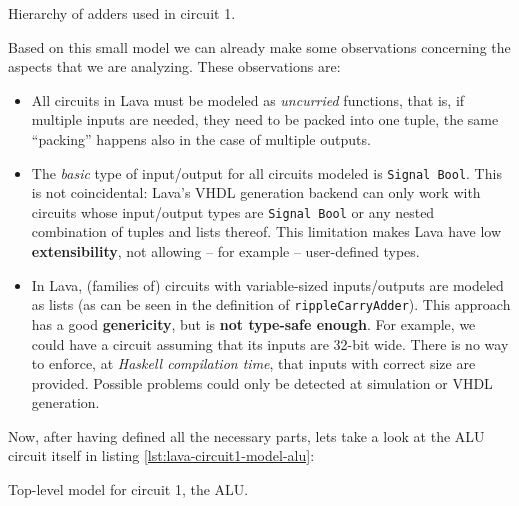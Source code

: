             \begin{listing}[h!]
                \caption{Hierarchy of adders used in circuit 1.
                    \label{lst:lava-circuit1-model-adders}}
            \end{listing}

            Based on this small model we can already make some observations concerning the aspects
            that we are analyzing. These observations are:

            \begin{itemize}
                \item All circuits in Lava must be modeled as \emph{uncurried} functions, that is,
                    if multiple inputs are needed, they need to be packed into one tuple, the same
                    ``packing'' happens also in the case of multiple outputs.

                \item The \emph{basic} type of input/output for all circuits modeled is
                    \texttt{Signal Bool}. This is not coincidental: Lava's VHDL generation backend
                    can only work with circuits whose input/output types are \texttt{Signal Bool} or
                    any nested combination of tuples and lists thereof.  This limitation makes Lava
                    have low \textbf{extensibility}, not allowing -- for example -- user-defined
                    types.

                \item In Lava, (families of) circuits with variable-sized inputs/outputs are modeled
                    as lists (as can be seen in the definition of \texttt{rippleCarryAdder}). This
                    approach has a good \textbf{genericity}, but is \textbf{not type-safe enough}.
                    For example, we could have a circuit assuming that its inputs are 32-bit wide.
                    There is no way to enforce, at \emph{Haskell compilation time}, that inputs with
                    correct size are provided.  Possible problems could only be detected at
                    simulation or VHDL generation.
            \end{itemize}

            Now, after having defined all the necessary parts, lets take a look at the ALU circuit
            itself in listing \ref{lst:lava-circuit1-model-alu}:

            \begin{listing}[h!]
                \caption{Top-level model for circuit 1, the ALU.
                    \label{lst:lava-circuit1-model-alu}}
            \end{listing}

